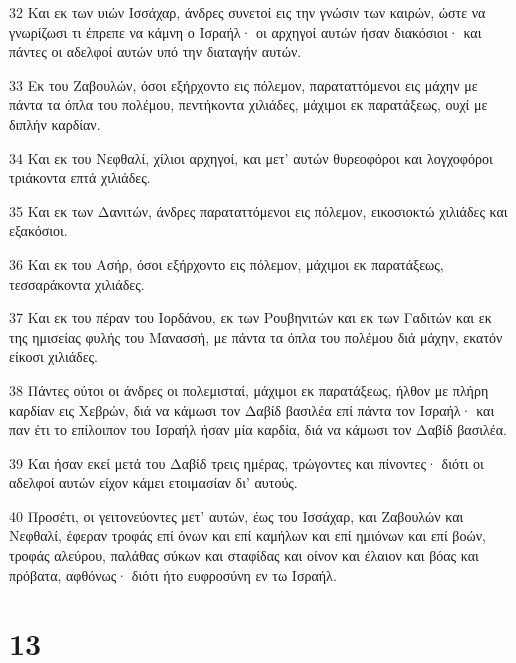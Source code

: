\par 32 Και εκ των υιών Ισσάχαρ, άνδρες συνετοί εις την γνώσιν των καιρών, ώστε να γνωρίζωσι τι έπρεπε να κάμνη ο Ισραήλ· οι αρχηγοί αυτών ήσαν διακόσιοι· και πάντες οι αδελφοί αυτών υπό την διαταγήν αυτών.
\par 33 Εκ του Ζαβουλών, όσοι εξήρχοντο εις πόλεμον, παραταττόμενοι εις μάχην με πάντα τα όπλα του πολέμου, πεντήκοντα χιλιάδες, μάχιμοι εκ παρατάξεως, ουχί με διπλήν καρδίαν.
\par 34 Και εκ του Νεφθαλί, χίλιοι αρχηγοί, και μετ' αυτών θυρεοφόροι και λογχοφόροι τριάκοντα επτά χιλιάδες.
\par 35 Και εκ των Δανιτών, άνδρες παραταττόμενοι εις πόλεμον, εικοσιοκτώ χιλιάδες και εξακόσιοι.
\par 36 Και εκ του Ασήρ, όσοι εξήρχοντο εις πόλεμον, μάχιμοι εκ παρατάξεως, τεσσαράκοντα χιλιάδες.
\par 37 Και εκ του πέραν του Ιορδάνου, εκ των Ρουβηνιτών και εκ των Γαδιτών και εκ της ημισείας φυλής του Μανασσή, με πάντα τα όπλα του πολέμου διά μάχην, εκατόν είκοσι χιλιάδες.
\par 38 Πάντες ούτοι οι άνδρες οι πολεμισταί, μάχιμοι εκ παρατάξεως, ήλθον με πλήρη καρδίαν εις Χεβρών, διά να κάμωσι τον Δαβίδ βασιλέα επί πάντα τον Ισραήλ· και παν έτι το επίλοιπον του Ισραήλ ήσαν μία καρδία, διά να κάμωσι τον Δαβίδ βασιλέα.
\par 39 Και ήσαν εκεί μετά του Δαβίδ τρεις ημέρας, τρώγοντες και πίνοντες· διότι οι αδελφοί αυτών είχον κάμει ετοιμασίαν δι' αυτούς.
\par 40 Προσέτι, οι γειτονεύοντες μετ' αυτών, έως του Ισσάχαρ, και Ζαβουλών και Νεφθαλί, έφεραν τροφάς επί όνων και επί καμήλων και επί ημιόνων και επί βοών, τροφάς αλεύρου, παλάθας σύκων και σταφίδας και οίνον και έλαιον και βόας και πρόβατα, αφθόνως· διότι ήτο ευφροσύνη εν τω Ισραήλ.

\chapter{13}

